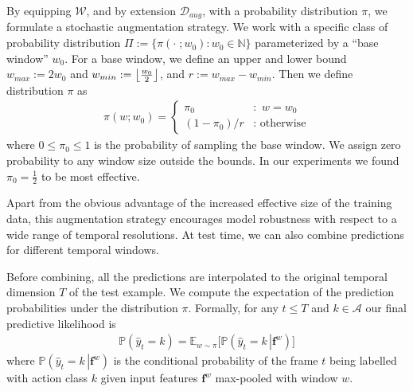 \documentclass[10pt,twocolumn,letterpaper]{article}
\newcommand{\calD}{\mathcal{D}}
\newcommand{\calA}{\mathcal{A}}
\newcommand{\calW}{\mathcal{W}}
\newcommand{\feat}{\mathbf{f}}
\newcommand{\PP}{\ensuremath{\mathbb{P}}}
\newcommand{\CP}[2]{\PP\!\left(\left. #1 \, \right| #2 \right)}
\newcommand{\EE}{\ensuremath{\mathbb{E}}}
\newcommand{\BK}[1]{ {\left( #1 \right)} }
\DeclarePairedDelimiter\floor{\lfloor}{\rfloor}
\begin{document}
By equipping $\calW$, and by extension $\calD_{aug}$, with a probability distribution $\pi$, we formulate a stochastic augmentation strategy. We work with a specific class of probability distribution $\Pi:=\{\pi\BK{\cdot\;; w_0}: w_0 \in \mathbb{N}\}$ parameterized by a ``base window'' $w_0$. For a base window, we define an upper and lower bound $w_{max} := 2w_0$ and $w_{min} := \floor*{\frac{w_0}{2}}$, and $r:=w_{max} - w_{min}$. Then we define distribution $\pi$ as
\begin{gather*}
    \pi\BK{w; w_0} = \left\{\begin{array}{ll}
         \pi_0 & : \,\,w=w_0 \\
         (1 - \pi_0) /r & : \,\, \text{otherwise}
    \end{array}\right.
\end{gather*}
where $0\le \pi_0 \le 1$ is the probability of sampling the base window. We assign zero probability to any window size outside the bounds. In our experiments we found $\pi_0 = \frac{1}{2}$ to be most effective.

Apart from the obvious advantage of the increased effective size of the training data, this augmentation strategy encourages model robustness with respect to a wide range of temporal resolutions.  At test time, we can also combine predictions for different temporal windows.  

Before combining, all the predictions are interpolated to the original temporal dimension $T$ of the test example.  We compute the expectation of the prediction probabilities under the distribution $\pi$. Formally, for any $t \le T$ and $k \in \calA$ our final predictive likelihood is 
\begin{gather}\label{eqn:augmented_predict}
    \PP\BK{\hat{y}_t = k} = \EE_{w\sim \pi} \Big[\CP{\hat{y}_t = k}{\feat^{w}}\Big]
\end{gather}
where $\CP{\hat{y}_t = k}{\feat^{w}}$ is the conditional probability of the frame $t$ being labelled with action class $k$ given input features $\feat^{w}$ max-pooled with window $w$. 
\end{document}
